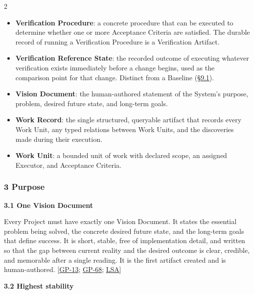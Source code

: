 \begin{multicols}{2}
\begin{itemize}
\item \textbf{Verification Procedure}: a concrete procedure that can be executed to determine whether one or more Acceptance Criteria are satisfied. The durable record of running a Verification Procedure is a Verification Artifact.

\item \textbf{Verification Reference State}: the recorded outcome of executing whatever verification exists immediately before a change begins, used as the comparison point for that change. Distinct from a Baseline (\hyperlink{nss-9.1}{\S9.1}).

\item \textbf{Vision Document}: the human-authored statement of the System's purpose, problem, desired future state, and long-term goals.

\item \textbf{Work Record}: the single structured, queryable artifact that records every Work Unit, any typed relations between Work Units, and the discoveries made during their execution.

\item \textbf{Work Unit}: a bounded unit of work with declared scope, an assigned Executor, and Acceptance Criteria.

\end{itemize}

\hypertarget{nss-3}{}

\subsubsection*{3 Purpose}

\hypertarget{nss-3.1}{}

\par\smallskip\noindent\textbf{3.1 One Vision Document}\par\nopagebreak

Every Project must have exactly one Vision Document. It states the essential problem being solved, the concrete desired future state, and the long-term goals that define success. It is short, stable, free of implementation detail, and written so that the gap between current reality and the desired outcome is clear, credible, and memorable after a single reading. It is the first artifact created and is human-authored. [\hyperlink{gp-13}{GP-13}; \hyperlink{gp-68}{GP-68}; \hyperlink{gp-LSA}{LSA}]

\hypertarget{nss-3.2}{}

\par\smallskip\noindent\textbf{3.2 Highest stability}\par\nopagebreak


\end{multicols}
